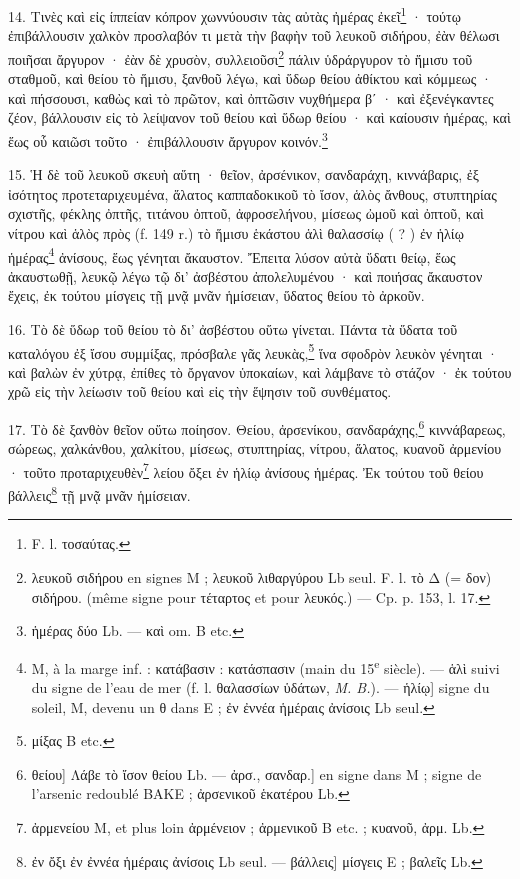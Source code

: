\documentclass[landscape, a4paper, 11pt, oneside, polutonikogreek, french]{article}
\begin{document}
14. Τινὲς καὶ εἰς ίππείαν κόπρον χωννύουσιν τὰς αὐτὰς ἠμέρας ἐκεῖ\footnote{F. l. τοσαύτας.} · τούτῳ ἐπιβάλλουσιν χαλκὸν προσλαβόν τι μετὰ τὴν βαφὴν τοῦ λευκοῦ σιδήρου, ἐὰν θέλωσι ποιῆσαι ἄργυρον · ἐὰν δὲ χρυσὸν, συλλειοῦσι\footnote{λευκοῦ σιδήρου en signes M ; λευκοῦ λιθαργύρου Lb seul. F. l. τὸ Δ (= δον) σιδήρου. (même signe pour τέταρτος et pour λευκός.) --- Cp. p. 153, l. 17.} πάλιν ὑδράργυρον τὸ ἥμισυ τοῦ σταθμοῦ, καὶ θείου τὸ ἥμισυ, ξανθοῦ λέγω, καὶ ὕδωρ θείου ἀθίκτου καὶ κόμμεως · καὶ πήσσουσι, καθὼς καὶ τὸ πρῶτον, καὶ ὀπτῶσιν νυχθήμερα βʹ · καὶ ἐξενέγκαντες ζέον, βάλλουσιν εἰς τὸ λείψανον τοῦ θείου καὶ ὕδωρ θείου · καὶ καίουσιν ἡμέρας, καὶ ἕως οὗ καιῶσι τοῦτο · ἐπιβάλλουσιν ἄργυρον κοινόν.\footnote{ἡμέρας δύο Lb. --- καὶ om. B etc.}

15. Ἡ δὲ τοῦ λευκοῦ σκευὴ αὕτη · θεῖον, ἀρσένικον, σανδαράχη, κιννάβαρις, ἐξ ἰσότητος προτεταριχευμένα, ἅλατος καππαδοκικοῦ τὸ ἴσον, ἁλὸς ἄνθους, στυπτηρίας σχιστῆς, φέκλης ὀπτῆς, τιτάνου ὀπτοῦ, ἀφροσελήνου, μίσεως ὠμοῦ καὶ ὀπτοῦ, καὶ νίτρου καὶ ἁλὸς πρὸς (f. 149 r.) τὸ ἥμισυ ἑκάστου ἁλὶ θαλασσίῳ ( ? ) ἐν ἡλίῳ ἡμέρας\footnote{M, à la marge inf. : κατάβασιν : κατάσπασιν (main du 15\textsuperscript{e} siècle). --- ἁλὶ suivi du signe de l'eau de mer (f. l. θαλασσίων ὑδάτων, \emph{M. B.}). --- ἡλίῳ] signe du soleil, M, devenu un θ dans E ; ἐν ἐννέα ἡμέραις ἀνίσοις Lb seul.} ἀνίσους, ἕως γένηται ἄκαυστον. Ἔπειτα λύσον αὐτὰ ὕδατι θείῳ, ἕως ἀκαυστωθῇ, λευκῷ λέγω τῷ δι' ἀσβέστου ἀπολελυμένου · καὶ ποιήσας ἄκαυστον ἔχεις, ἐκ τούτου μίσγεις τῇ μνᾷ μνᾶν ἡμίσειαν, ὕδατος θείου τὸ ἀρκοῦν.

16. Τὸ δὲ ὕδωρ τοῦ θείου τὸ δι' ἀσβέστου οὕτω γίνεται. Πάντα τὰ ὕδατα τοῦ καταλόγου ἐξ ἴσου συμμίξας, πρόσβαλε γᾶς λευκὰς,\footnote{μίξας B etc.} ἵνα σφοδρὸν λευκὸν γένηται · καὶ βαλὼν ἐν χύτρᾳ, ἐπίθες τὸ ὄργανον ὑποκαίων, καὶ λάμβανε τὸ στάζον · ἐκ τούτου χρῶ εἰς τὴν λείωσιν τοῦ θείου καὶ εἰς τὴν ἕψησιν τοῦ συνθέματος.

17. Τὸ δὲ ξανθὸν θεῖον οὕτω ποίησον. Θείου, ἀρσενίκου, σανδαράχης,\footnote{θείου] Λάβε τὸ ἴσον θείου Lb. --- ἀρσ., σανδαρ.] en signe dans M ; signe de l'arsenic redoublé BAKE ; ἀρσενικοῦ ἑκατέρου Lb.} κιννάβαρεως, σώρεως, χαλκάνθου, χαλκίτου, μίσεως, στυπτηρίας, νίτρου, ἅλατος, κυανοῦ ἀρμενίου · τοῦτο προταριχευθὲν\footnote{ἀρμενείου M, et plus loin ἀρμένειον ; ἀρμενικοῦ B etc. ; κυανοῦ, ἀρμ. Lb.} λείου ὄξει ἐν ἡλίῳ ἀνίσους ἡμέρας. Ἐκ τούτου τοῦ θείου βάλλεις\footnote{ἐν ὄξι ἐν ἐννέα ἡμέραις ἀνίσοις Lb seul. --- βάλλεις] μίσγεις E ; βαλεῖς Lb.} τῇ μνᾷ μνᾶν ἡμίσειαν.
\end{document}
